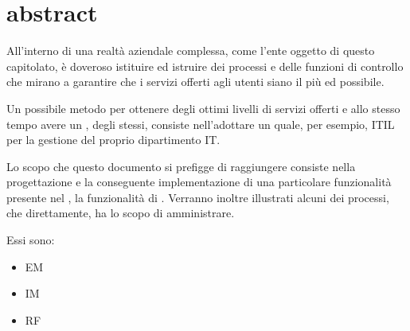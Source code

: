 %
%
\chapter[Abstract]{abstract}
\label{abs}
All'interno di una realtà aziendale complessa, come l'ente oggetto di questo capitolato, è doveroso istituire ed istruire dei processi e delle funzioni di controllo che mirano a garantire che i servizi offerti agli utenti siano il più  ed  possibile.

Un possibile metodo per ottenere degli ottimi livelli di servizi offerti e allo stesso tempo avere un , degli stessi, consiste nell'adottare un  quale, per esempio, \ac{ITIL} per la gestione del proprio dipartimento \acs{IT}.

Lo scopo che questo documento si prefigge di raggiungere consiste nella progettazione e la conseguente implementazione di una particolare funzionalità presente nel , la funzionalità di . Verranno inoltre illustrati alcuni dei processi, che direttamente, ha lo scopo di amministrare.

Essi sono: 

\begin{itemize}
\item{\acf{EM}}
\item{\acf{IM}}
\item{\acf{RF}}
\end{itemize}





